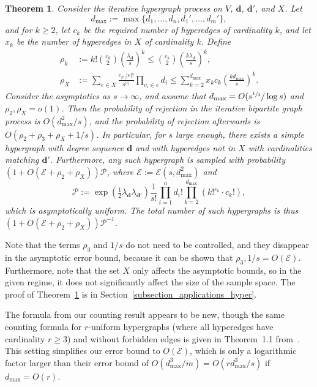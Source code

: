 \documentclass{article}
\theoremstyle{plain}
\newtheorem{theorem}{Theorem}[section]
\theoremstyle{remark}
\theoremstyle{plain}
\numberwithin{equation}{section}
\renewcommand{\d}{{\boldsymbol{d}}}
\begin{document}
	\begin{theorem}\label{theorem_hyper}
		Consider the iterative hypergraph process on $V$, $\d$, $\d'$, and $X$. Let $$d_{\max}:=\max\{d_1,\ldots,d_n,d_1',\ldots,d_m'\},$$ and for $k\geq2$, let $c_k$ be the required number of hyperedges of cardinality $k$, and let $x_k$ be the number of hyperedges in $X$ of cardinality $k$. Define
		\begin{align}
			\rho_k&:=k!\binom{c_k}{2}\left(\frac{\lambda_{\d}}{s}\right)^k\leq\binom{c_k}{2}\left(\frac{k\lambda_{\d}}{s}\right)^k,
			\\\rho_X&:=\sum_{e\in X}\frac{c_{|e|}|e|!}{s^{|e|}}\prod_{v_i\in e}d_i\leq\sum_{k=2}^{d_{\max}}x_{k}c_{k}\left(\frac{kd_{\max}}{s}\right)^{k}.
		\end{align}
		Consider the asymptotics as $s\to\infty$, and assume that $d_{\max}=O(s^{\sfrac14}/\log s)$ and $\rho_2,\rho_X=o(1)$. Then the probability of rejection in the iterative bipartite graph process is $O(d_{\max}^2/s)$, and the probability of rejection afterwards is $O(\rho_2+\rho_3+\rho_X+1/s)$. In particular, for $s$ large enough, there exists a simple hypergraph with degree sequence $\d$ and with hyperedges not in $X$ with cardinalities matching $\d'$. Furthermore, any such hypergraph is sampled with probability $(1+O(\mathscr{E}+\rho_2+\rho_X))\mathscr{P}$, where $\mathscr{E}:=\mathscr{E}(s,d_{\max}^2)$ and $$\mathscr{P}:=\exp\left(\tfrac12\lambda_{\d}\lambda_{\boldsymbol{\d'}}\right)\frac1{s!}\prod_{i=1}^{n}d_i!\prod_{k=2}^{d_{\max}}(k!^{c_k}\cdot c_k!),$$ which is asymptotically uniform. The total number of such hypergraphs is thus $(1+O(\mathscr{E}+\rho_2+\rho_X))\mathscr{P}^{-1}$.
	\end{theorem}
	
	Note that the terms $\rho_3$ and $1/s$ do not need to be controlled, and they disappear in the asymptotic error bound, because it can be shown that $\rho_3,1/s=O(\mathscr{E})$. Furthermore, note that the set $X$ only affects the asymptotic bounds, so in the given regime, it does not significantly affect the size of the sample space. The proof of Theorem~\ref{theorem_hyper} is in Section~\ref{subsection_applications_hyper}.
	
	The formula from our counting result appears to be new, though the same counting formula for $r$-uniform hypergraphs (where all hyperedges have cardinality $r\geq3$) and without forbidden edges is given in Theorem~1.1 from~\cite{BLINOVSKY2016287}. This setting simplifies our error bound to $O(\mathscr{E})$, which is only a logarithmic factor larger than their error bound of $O(d_{\max}^3/m)=O(rd_{\max}^3/s)$ if $d_{\max}=O(r)$.
	
\end{document}
